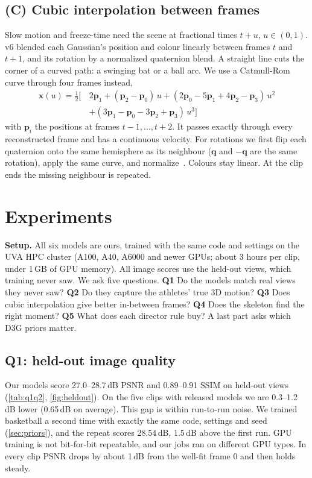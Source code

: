 \documentclass[10pt,twocolumn,letterpaper]{article}
\newcommand{\dB}{\,dB\xspace}
\begin{document}
\subsection{(C) Cubic interpolation between frames}
Slow motion and freeze-time need the scene at fractional times $t{+}u$, $u\in(0,1)$. v6 blended each Gaussian's position and colour linearly between frames $t$ and $t{+}1$, and its rotation by a normalized quaternion blend. A straight line cuts the corner of a curved path: a swinging bat or a ball arc. We use a Catmull-Rom curve through four frames instead,
\begin{equation}
\begin{aligned}
\mathbf{x}(u)=\tfrac12\big[\,&2\mathbf{p}_1+(\mathbf{p}_2{-}\mathbf{p}_0)\,u+(2\mathbf{p}_0{-}5\mathbf{p}_1{+}4\mathbf{p}_2{-}\mathbf{p}_3)\,u^2\\
&+(3\mathbf{p}_1{-}\mathbf{p}_0{-}3\mathbf{p}_2{+}\mathbf{p}_3)\,u^3\big]
\end{aligned}
\end{equation}
with $\mathbf{p}_i$ the positions at frames $t{-}1,\dots,t{+}2$. It passes exactly through every reconstructed frame and has a continuous velocity. For rotations we first flip each quaternion onto the same hemisphere as its neighbour ($\mathbf{q}$ and $-\mathbf{q}$ are the same rotation), apply the same curve, and normalize~\cite{shoemake1985}. Colours stay linear. At the clip ends the missing neighbour is repeated.

\section{Experiments}
\label{sec:exp}

\noindent\textbf{Setup.} All six models are ours, trained with the same code and settings on the UVA HPC cluster (A100, A40, A6000 and newer GPUs; about 3 hours per clip, under 1\,GB of GPU memory). All image scores use the held-out views, which training never saw. We ask five questions. \textbf{Q1} Do the models match real views they never saw? \textbf{Q2} Do they capture the athletes' true 3D motion? \textbf{Q3} Does cubic interpolation give better in-between frames? \textbf{Q4} Does the skeleton find the right moment? \textbf{Q5} What does each director rule buy? A last part asks which D3G priors matter.

\subsection{Q1: held-out image quality}
Our models score 27.0--28.7\dB PSNR and 0.89--0.91 SSIM on held-out views (\cref{tab:q1q2}, \cref{fig:heldout}). On the five clips with released models we are 0.3--1.2\dB lower (0.65\dB on average). This gap is within run-to-run noise. We trained basketball a second time with exactly the same code, settings and seed (\cref{sec:priors}), and the repeat scores 28.54\dB, 1.5\dB above the first run. GPU training is not bit-for-bit repeatable, and our jobs ran on different GPU types. In every clip PSNR drops by about 1\dB from the well-fit frame 0 and then holds steady.
\end{document}
